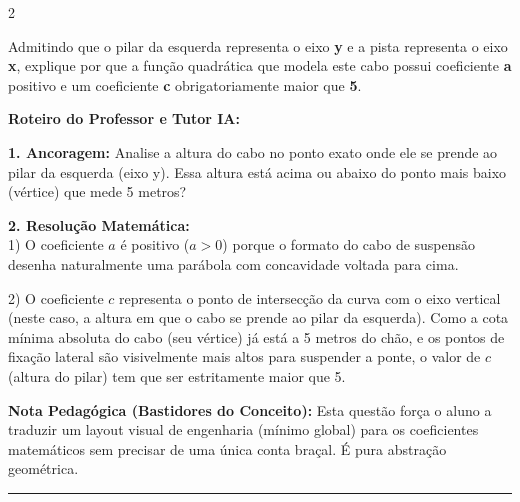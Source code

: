 \begin{multicols*}{2}
\begin{enunciadoLiteral}
Admitindo que o pilar da esquerda representa o eixo \textbf{y} e a pista representa o eixo \textbf{x}, explique por que a função quadrática que modela este cabo possui coeficiente \textbf{a} positivo e um coeficiente \textbf{c} obrigatoriamente maior que \textbf{5}.
\end{enunciadoLiteral}

\ifgabarito
    \begin{tcolorbox}[colback=CorTitUm!5, colframe=CorTitUm, boxrule=1pt, arc=4pt, left=6pt, right=6pt, top=6pt, bottom=6pt]
    \small\textbf{\textcolor{CorTitUm}{Roteiro do Professor e Tutor IA:}}\par\vspace{0.1cm}
    \color{CinzaEscuro}
    \textbf{1. Ancoragem:} Analise a altura do cabo no ponto exato onde ele se prende ao pilar da esquerda (eixo y). Essa altura está acima ou abaixo do ponto mais baixo (vértice) que mede 5 metros?\par\vspace{0.1cm}
    \textbf{2. Resolução Matemática:}\\
    1) O coeficiente $a$ é positivo ($a > 0$) porque o formato do cabo de suspensão desenha naturalmente uma parábola com concavidade voltada para cima.
    
    2) O coeficiente $c$ representa o ponto de intersecção da curva com o eixo vertical (neste caso, a altura em que o cabo se prende ao pilar da esquerda). Como a cota mínima absoluta do cabo (seu vértice) já está a 5 metros do chão, e os pontos de fixação lateral são visivelmente mais altos para suspender a ponte, o valor de $c$ (altura do pilar) tem que ser estritamente maior que 5.
    \end{tcolorbox}
    \vspace{0.15cm}
    
    \begin{boxexplicacao}
    \textbf{Nota Pedagógica (Bastidores do Conceito):} Esta questão força o aluno a traduzir um layout visual de engenharia (mínimo global) para os coeficientes matemáticos sem precisar de uma única conta braçal. É pura abstração geométrica.
    \end{boxexplicacao}
\fi

\par\vspace{\espacoQuestao}

\noindent\textcolor{CorLinha}{\rule{\linewidth}{0.5pt}} 
\par\vspace{\espacoPreQuestao}

\end{multicols*}
